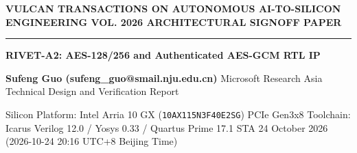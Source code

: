 \documentclass[11pt,a4paper]{article}
\begin{document}
{\scriptsize\sffamily\textcolor{vulcan}{\textbf{VULCAN TRANSACTIONS ON AUTONOMOUS AI-TO-SILICON ENGINEERING \hfill VOL. 2026 \textperiodcentered{} ARCHITECTURAL SIGNOFF PAPER}}\par}

\vspace{1pt}\textcolor{vulcan}{\rule{\textwidth}{1.2pt}}\vspace{4pt}

\begin{center}

{\sffamily\LARGE\bfseries RIVET-A2: AES-128/\allowbreak{}256 and Authenticated AES-GCM RTL IP\par}\vspace{3pt}

{\small\sffamily\textbf{Sufeng Guo (\allowbreak{}sufeng\_\allowbreak{}guo@smail.nju.edu.cn)\allowbreak{}} \textperiodcentered{} Microsoft Research Asia \textperiodcentered{} Technical Design and Verification Report\par}\vspace{1pt}

{\scriptsize\sffamily\textcolor{black!75}{Silicon Platform: Intel Arria 10 GX (\texttt{10AX115N3F40E2SG}) PCIe Gen3x8 \textperiodcentered{} Toolchain: Icarus Verilog 12.0 / Yosys 0.33 / Quartus Prime 17.1 STA \textperiodcentered{} 24 October 2026 (\allowbreak{}2026-10-24 20:16 UTC+\allowbreak{}8 Beijing Time)\allowbreak{}}\par}

\end{center}\vspace{2pt}

\renewcommand{\abstractname}{\textcolor{vulcanblue}{Abstract}}\begin{abstract}\noindent RIVET-A2 is a modular SystemVerilog cryptographic engine for raw AES-128/\allowbreak{}256 encryption and decryption and AES-GCM authenticated encryption and decryption. It preserves the RIVET-A1 iterative-round architecture while adding AES-256 key expansion,\allowbreak{} streamed additional authenticated data,\allowbreak{} partial payload blocks,\allowbreak{} full-width tags and authenticated-release storage. Independent reference-based simulation passed at payload capacities of 1,\allowbreak{} 3,\allowbreak{} 16 and 256 blocks. All six targeted functional mutants were rejected,\allowbreak{} and generic Yosys synthesis passed at capacities 1,\allowbreak{} 3 and 16 with no inferred latches or unresolved modules. These results establish bounded functional and generic synthesis verification of RTL IP,\allowbreak{} not physical implementation or cryptographic certification.\par{}\end{abstract}\vspace{2pt}
\end{document}
